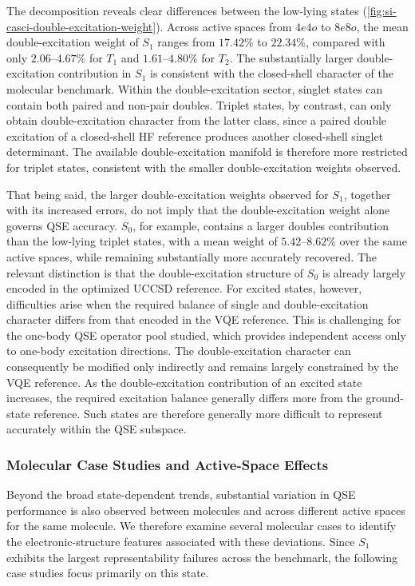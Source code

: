 The decomposition reveals clear differences between the low-lying states (\cref{fig:si-casci-double-excitation-weight}). 
Across active spaces from $4e4o$ to $8e8o$, the mean double-excitation weight of $S_1$ ranges from $17.42\%$ to $22.34\%$, compared with only $2.06$--$4.67\%$ for $T_1$ and $1.61$--$4.80\%$ for $T_2$. 
The substantially larger double-excitation contribution in $S_1$ is consistent with the closed-shell character of the molecular benchmark.
Within the double-excitation sector, singlet states can contain both paired and non-pair doubles. 
Triplet states, by contrast, can only obtain double-excitation character from the latter class, since a paired double excitation of a closed-shell HF reference produces another closed-shell singlet determinant. 
The available double-excitation manifold is therefore more restricted for triplet states, consistent with the smaller double-excitation weights observed.

That being said, the larger double-excitation weights observed for $S_1$, together with its increased errors, do not imply that the double-excitation weight alone governs QSE accuracy. 
$S_0$, for example, contains a larger doubles contribution than the low-lying triplet states, with a mean weight of $5.42$--$8.62\%$ over the same active spaces, while remaining substantially more accurately recovered. 
The relevant distinction is that the double-excitation structure of $S_0$ is already largely encoded in the optimized UCCSD reference. 
For excited states, however, difficulties arise when the required balance of single and double-excitation character differs from that encoded in the VQE reference.
This is challenging for the one-body QSE operator pool studied, which provides independent access only to one-body excitation directions. 
The double-excitation character can consequently be modified only indirectly and remains largely constrained by the VQE reference. 
As the double-excitation contribution of an excited state increases, the required excitation balance generally differs more from the ground-state reference. 
Such states are therefore generally more difficult to represent accurately within the QSE subspace.

\subsubsection{Molecular Case Studies and Active-Space Effects}
Beyond the broad state-dependent trends, substantial variation in QSE performance is also observed between molecules and across different active spaces for the same molecule. 
We therefore examine several molecular cases to identify the electronic-structure features associated with these deviations.
Since $S_1$ exhibits the largest representability failures across the benchmark, the following case studies focus primarily on this state. 

